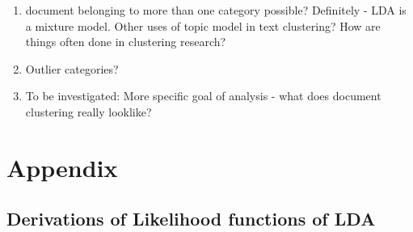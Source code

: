 \documentclass{article}
\begin{document}
\begin{enumerate}
  \item document belonging to more than one category possible? Definitely - LDA is a mixture model. Other uses of topic model in text clustering? How are things often done in clustering research? 
  \item Outlier categories?
  \item To be investigated: More specific goal of analysis - what does document clustering really looklike?
\end{enumerate}



\section{Appendix}


\subsection{Derivations of Likelihood functions of LDA}




\end{document}
